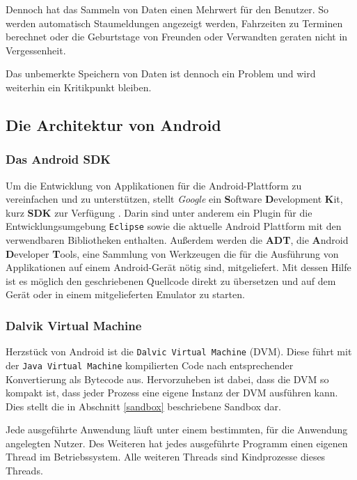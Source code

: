 Dennoch hat das Sammeln von Daten einen Mehrwert für den Benutzer. So werden automatisch Staumeldungen angezeigt werden, Fahrzeiten zu Terminen berechnet oder die Geburtstage von Freunden oder Verwandten geraten nicht in Vergessenheit.

Das unbemerkte Speichern von Daten ist dennoch ein Problem und wird weiterhin ein Kritikpunkt bleiben.

\subsection{Die Architektur von Android}

\subsubsection{Das Android SDK}

Um die Entwicklung von Applikationen für die Android-Plattform zu vereinfachen und zu unterstützen, stellt \emph{Google} ein \textbf{S}oftware \textbf{D}evelopment \textbf{K}it, kurz \textbf{SDK} zur Verfügung \cite{android_sdk}. Darin sind unter anderem ein Plugin für die Entwicklungsumgebung \verb+Eclipse+ sowie die aktuelle Android Plattform mit den verwendbaren Bibliotheken enthalten. Außerdem werden die \textbf{ADT}, die \textbf{A}ndroid \textbf{D}eveloper \textbf{T}ools, eine Sammlung von Werkzeugen die für die Ausführung von Applikationen auf einem Android-Gerät nötig sind, mitgeliefert. Mit dessen Hilfe ist es möglich den geschriebenen Quellcode direkt zu übersetzen und auf dem Gerät oder in einem mitgelieferten Emulator zu starten.

\subsubsection{Dalvik Virtual Machine}

Herzstück von Android ist die \verb+Dalvic Virtual Machine+ (DVM). Diese führt mit der \verb+Java Virtual Machine+ kompilierten Code nach entsprechender Konvertierung als Bytecode aus. Hervorzuheben ist dabei, dass die DVM so kompakt ist, dass jeder Prozess eine eigene Instanz der DVM ausführen kann. Dies stellt die in Abschnitt \ref{sandbox} beschriebene Sandbox dar.

Jede ausgeführte Anwendung läuft unter einem bestimmten, für die Anwendung angelegten Nutzer. Des Weiteren hat jedes ausgeführte Programm einen eigenen Thread im Betriebssystem. Alle weiteren Threads sind Kindprozesse dieses Threads.

